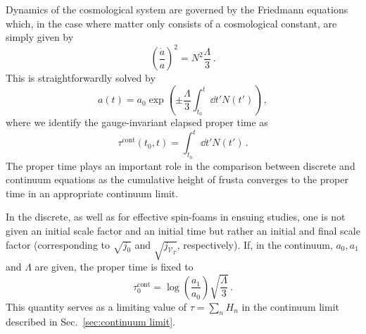 \documentclass[amsmath,amssymb,aps,twocolumn,superscriptaddress,nofootinbib]{revtex4-1}
\begin{document}
Dynamics of the cosmological system are governed by the Friedmann equations which, in the case where matter only consists of a cosmological constant, are simply given by
%
\begin{equation}\label{eq:Friedmann}
\left(\frac{\dot{a}}{a}\right)^2 = N^2\frac{\Lambda}{3}\,.
\end{equation}
%
This is straightforwardly solved by
%
\begin{equation}
a(t) = a_0 \exp\left(\pm\frac{\Lambda}{3}\int_{t_0}^{t}\dd{t'}N(t')\right)\,,
\end{equation}
%
where we identify the gauge-invariant elapsed proper time as
%
\begin{equation}
\tau^{\mathrm{cont}}(t_0,t) = \int_{t_0}^{t}\dd{t'}N(t')\,.
\end{equation}
%
The proper time plays an important role in the comparison between discrete and continuum equations as the cumulative height of frusta converges to the proper time in an appropriate continuum limit.

In the discrete, as well as for effective spin-foams in ensuing studies, one is not given an initial scale factor and an initial time but rather an initial and final scale factor (corresponding to $\sqrt{j_0}$ and $\sqrt{j_{\mathcal{V}_T}}$, respectively).
If, in the continuum, $a_0,a_1$ and $\Lambda$ are given, the proper time is fixed to
%
\begin{equation}\label{eq:continuum prop time}
\tau_0^{\mathrm{cont}} = \log\left(\frac{a_1}{a_0}\right)\sqrt{\frac{\Lambda}{3}}\,.
\end{equation}
%
This quantity serves as a limiting value of $\tau = \sum_n H_n$ in the continuum limit described in Sec.~\ref{sec:continuum limit}.











\end{document}
